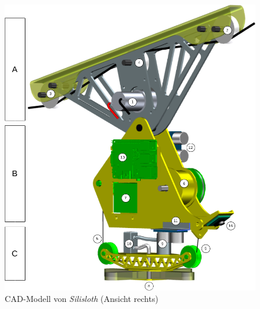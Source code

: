 \begin{figure}
    \centering
    \includegraphics[width=\linewidth]{pics/cad-rechts.png}
    \caption{CAD-Modell von \textit{Silisloth} (Ansicht rechts)}
    \label{fig:laufkatze-rechts}
\end{figure}

